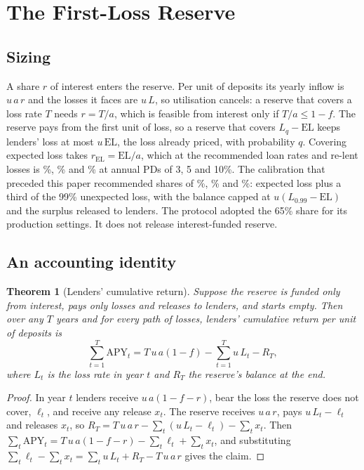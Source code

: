 \documentclass[11pt]{article}
\theoremstyle{plain}
\newtheorem{theorem}{Theorem}
\theoremstyle{definition}
\newcommand{\EL}{\mathrm{EL}}
\begin{document}
\section{The First-Loss Reserve}\label{sec:reserve}

\subsection{Sizing}

A share $r$ of interest enters the reserve. Per unit of deposits its yearly inflow is $u\,a\,r$ and
the losses it faces are $u\,L$, so utilisation cancels: a reserve that covers a loss rate $T$ needs
$r=T/a$, which is feasible from interest only if $T/a\le1-f$. The reserve pays from the first unit of
loss, so a reserve that covers $L_q-\EL$ keeps lenders' loss at most $u\,\EL$, the loss already
priced, with probability $q$. Covering expected loss takes $r_{\EL}=\EL/a$, which at the recommended
loan rates and re-lent losses is \RElThree\%, \RElFive\% and \RElTen\% at annual PDs of 3, 5 and 10\%.
The calibration that preceded this paper recommended shares of \RRecThree\%, \RRecFive\% and
\RRecTen\%: expected loss plus a third of the 99\% unexpected loss, with the balance capped at
$u(L_{0.99}-\EL)$ and the surplus released to lenders. The protocol adopted the 65\% share for its
production settings. It does not release interest-funded reserve.

\subsection{An accounting identity}

\begin{theorem}[Lenders' cumulative return]\label{thm:identity}
Suppose the reserve is funded only from interest, pays only losses and releases to lenders, and starts
empty. Then over any $T$ years and for every path of losses, lenders' cumulative return per unit of
deposits is
\[
  \sum_{t=1}^{T}\mathrm{APY}_t=T\,u\,a(1-f)-\sum_{t=1}^{T}u\,L_t-R_T,
\]
where $L_t$ is the loss rate in year $t$ and $R_T$ the reserve's balance at the end.
\end{theorem}

\begin{proof}
In year $t$ lenders receive $u\,a(1-f-r)$, bear the loss the reserve does not cover, $\ell_t$, and
receive any release $x_t$. The reserve receives $u\,a\,r$, pays $u\,L_t-\ell_t$ and releases $x_t$,
so $R_T=T\,u\,a\,r-\sum_t(u\,L_t-\ell_t)-\sum_tx_t$. Then
$\sum_t\mathrm{APY}_t=T\,u\,a(1-f-r)-\sum_t\ell_t+\sum_tx_t$, and substituting
$\sum_t\ell_t-\sum_tx_t=\sum_tu\,L_t+R_T-T\,u\,a\,r$ gives the claim.
\end{proof}
\end{document}
